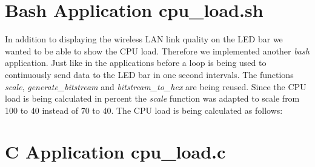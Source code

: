 \section{Bash Application cpu\_load.sh}

In addition to displaying the wireless LAN link quality on the LED bar we wanted to be able to show the CPU load. Therefore we implemented another \textit{bash} application.  Just like in the applications before a loop is being used to continuously send data to the LED bar in one second intervals. The functions \textit{scale}, \textit{generate\_bitstream} and \textit{bitstream\_to\_hex} are being reused. Since the CPU load is being calculated in percent the \textit{scale} function was adapted to scale from 100 to 40 instead of 70 to 40. The CPU load is being calculated as follows:






\section{C Application cpu\_load.c}
